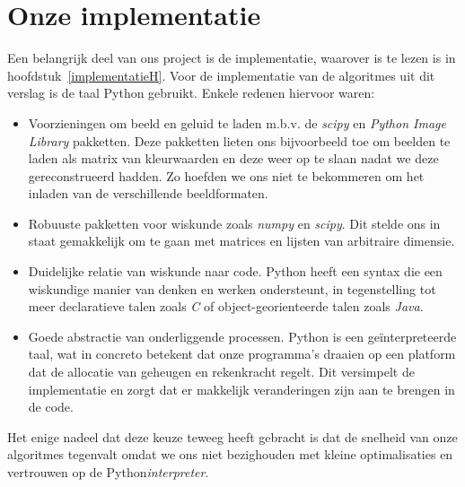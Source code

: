 \documentclass[11pt]{uvamath}
\theoremstyle{plain}
\theoremstyle{definition}
\theoremstyle{remark}
\begin{document}
\section*{Onze implementatie}
Een belangrijk deel van ons project is de implementatie, waarover is te lezen is in 
\mbox{hoofdstuk \ref{implementatieH}}. 
Voor de implementatie van de algoritmes uit dit verslag is de taal Python gebruikt.
Enkele redenen hiervoor waren:
\begin{itemize}
\item Voorzieningen om beeld en geluid te laden m.b.v. de \emph{scipy}\cite{scipy} en \emph{Python Image Library}\cite{pil} pakketten.
  Deze pakketten lieten ons bijvoorbeeld toe om beelden te laden als matrix van kleurwaarden en deze weer op te slaan
  nadat we deze gereconstrueerd hadden. Zo hoefden we ons niet te bekommeren om het inladen van de verschillende beeldformaten.
\item Robuuste pakketten voor wiskunde zoals \emph{numpy}\cite{numpy} en \emph{scipy}. Dit stelde ons in staat gemakkelijk om te gaan met matrices en lijsten van arbitraire dimensie.
\item Duidelijke relatie van wiskunde naar code. Python heeft een syntax die een wiskundige manier van denken en werken
  ondersteunt, in tegenstelling tot meer declaratieve talen zoals \emph{C} of object-georienteerde talen zoals \emph{Java}.
\item Goede abstractie van onderliggende processen. Python is een ge\"interpreteerde taal, wat in concreto betekent
  dat onze programma's draaien op een platform dat de allocatie van geheugen en rekenkracht regelt. Dit versimpelt
  de implementatie en zorgt dat er makkelijk veranderingen zijn aan te brengen in de code.
\end{itemize}
Het enige nadeel dat deze keuze teweeg heeft gebracht is dat de snelheid van onze algoritmes tegenvalt
omdat we ons niet bezighouden met kleine optimalisaties en vertrouwen op de Python\emph{interpreter}.














\end{document}
